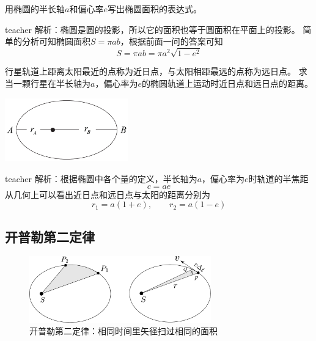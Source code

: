 \begin{example}
用椭圆的半长轴$a$和偏心率$e$写出椭圆面积的表达式。
\begin{taggedblock}{teacher}
\newline
解析：椭圆是圆的投影，所以它的面积也等于圆面积在平面上的投影。
简单的分析可知椭圆面积$S=\pi ab$，根据前面一问的答案可知
\[S=\pi a b = \pi a^2\sqrt{1-e^2}\]
\end{taggedblock}
\end{example}

\begin{example}
行星轨道上距离太阳最近的点称为近日点，与太阳相距最远的点称为远日点。
求当一颗行星在半长轴为$a$，偏心率为$e$的椭圆轨道上运动时近日点和远日点的距离。
\begin{flushright}
\includegraphics[width = 0.4\textwidth]{images/motion-38.pdf} 
\end{flushright}
\begin{taggedblock}{teacher}
\noindent
解析：根据椭圆中各个量的定义，半长轴为$a$，偏心率为$e$时轨道的半焦距
\[
c = ae
\]
从几何上可以看出近日点和远日点与太阳的距离分别为
\[ r_1 = a(1+e),\qquad r_2 = a(1-e) \]
\end{taggedblock}
\end{example}






\subsection{开普勒第二定律}
\begin{figure}[hbtp]
\centering
\includegraphics[width=0.7\textwidth]{images/motion-22.pdf}
\caption{开普勒第二定律：相同时间里矢径扫过相同的面积}\label{fig: motion-开普勒第二定律解释}
\end{figure}



